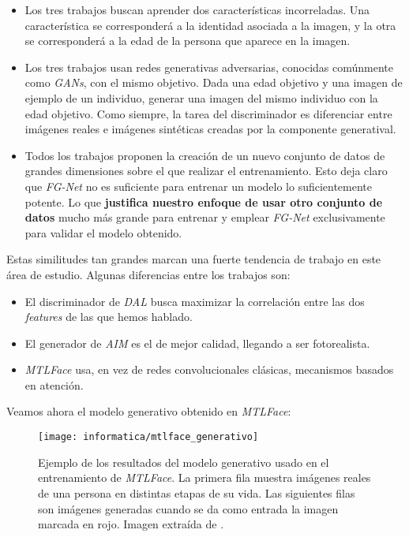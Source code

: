 \begin{itemize}
	\item Los tres trabajos buscan aprender dos características incorreladas. Una característica se corresponderá a la identidad asociada a la imagen, y la otra se corresponderá a la edad de la persona que aparece en la imagen.
	\item Los tres trabajos usan redes generativas adversarias, conocidas comúnmente como \textit{GANs}, con el mismo objetivo. Dada una edad objetivo y una imagen de ejemplo de un individuo, generar una imagen del mismo individuo con la edad objetivo. Como siempre, la tarea del discriminador es diferenciar entre imágenes reales e imágenes sintéticas creadas por la componente generatival.
	\item Todos los trabajos proponen la creación de un nuevo conjunto de datos de grandes dimensiones sobre el que realizar el entrenamiento. Esto deja claro que \textit{FG-Net} no es suficiente para entrenar un modelo lo suficientemente potente. Lo que \textbf{justifica nuestro enfoque de usar otro conjunto de datos} mucho más grande para entrenar y emplear \textit{FG-Net} exclusivamente para validar el modelo obtenido.
\end{itemize}

Estas similitudes tan grandes marcan una fuerte tendencia de trabajo en este área de estudio. Algunas diferencias entre los trabajos son:

\begin{itemize}
	\item El discriminador de \textit{DAL} busca maximizar la correlación entre las dos \textit{features} de las que hemos hablado.
	\item El generador de \textit{AIM} es el de mejor calidad, llegando a ser fotorealista.
	\item \textit{MTLFace} usa, en vez de redes convolucionales clásicas, mecanismos basados en atención.
\end{itemize}

Veamos ahora el modelo generativo obtenido en \textit{MTLFace}:

\begin{figure}[H]
	\centering
	\texttt{[image: informatica/mtlface\_generativo]}
	\caption{Ejemplo de los resultados del modelo generativo usado en el entrenamiento de \textit{MTLFace}. La primera fila muestra imágenes reales de una persona en distintas etapas de su vida. Las siguientes filas son imágenes generadas cuando se da como entrada la imagen marcada en rojo. Imagen extraída de \cite{informatica:best_fgnet_model}.}
\end{figure}

